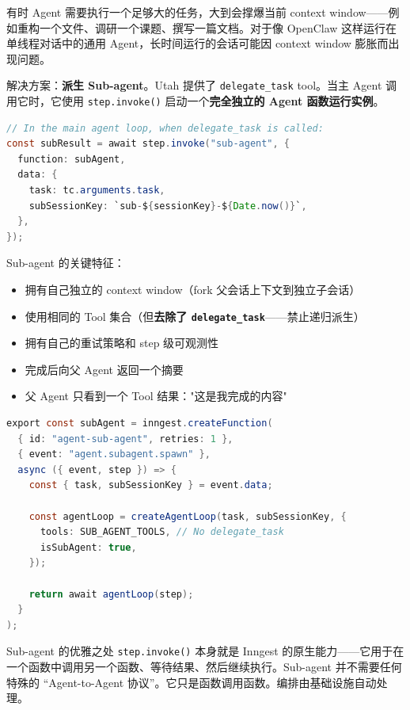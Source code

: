 \documentclass[a4paper]{article}
\begin{document}
有时 Agent 需要执行一个足够大的任务，大到会撑爆当前 context window——例如重构一个文件、调研一个课题、撰写一篇文档。对于像 OpenClaw 这样运行在单线程对话中的通用 Agent，长时间运行的会话可能因 context window 膨胀而出现问题。

解决方案：\textbf{派生 Sub-agent}。Utah 提供了 \texttt{delegate\_task} tool。当主 Agent 调用它时，它使用 \texttt{step.invoke()} 启动一个\textbf{完全独立的 Agent 函数运行实例}。

\begin{lstlisting}[caption={主 Agent 委派子任务},language=Java]
// In the main agent loop, when delegate_task is called:
const subResult = await step.invoke("sub-agent", {
  function: subAgent,
  data: {
    task: tc.arguments.task,
    subSessionKey: `sub-${sessionKey}-${Date.now()}`,
  },
});
\end{lstlisting}

Sub-agent 的关键特征：

\begin{itemize}
    \item 拥有自己独立的 context window（fork 父会话上下文到独立子会话）
    \item 使用相同的 Tool 集合（但\textbf{去除了 \texttt{delegate\_task}}——禁止递归派生）
    \item 拥有自己的重试策略和 step 级可观测性
    \item 完成后向父 Agent 返回一个摘要
    \item 父 Agent 只看到一个 Tool 结果："这是我完成的内容"
\end{itemize}

\begin{lstlisting}[caption={Sub-agent 函数定义（简化版）},language=Java]
export const subAgent = inngest.createFunction(
  { id: "agent-sub-agent", retries: 1 },
  { event: "agent.subagent.spawn" },
  async ({ event, step }) => {
    const { task, subSessionKey } = event.data;

    const agentLoop = createAgentLoop(task, subSessionKey, {
      tools: SUB_AGENT_TOOLS, // No delegate_task
      isSubAgent: true,
    });

    return await agentLoop(step);
  }
);
\end{lstlisting}

\begin{importantbox}{Sub-agent 的优雅之处}
\texttt{step.invoke()} 本身就是 Inngest 的原生能力——它用于在一个函数中调用另一个函数、等待结果、然后继续执行。Sub-agent 并不需要任何特殊的 ``Agent-to-Agent 协议''。它只是函数调用函数。编排由基础设施自动处理。
\end{importantbox}
\end{document}
